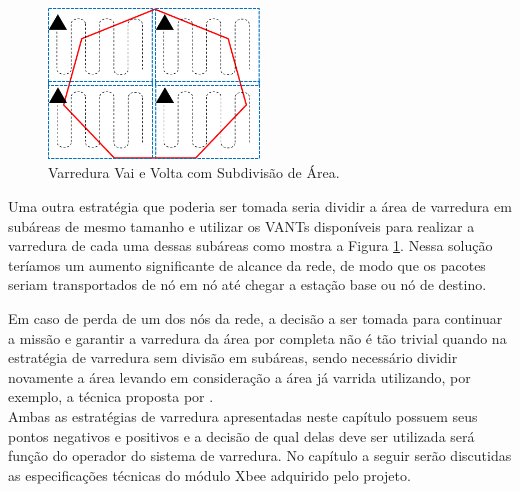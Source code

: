 \begin{figure} 
\center
\includegraphics[width=0.5\textwidth]{comsubdivisao.png}
\caption{Varredura Vai e Volta com Subdivisão de Área.} 
\label{fig:comsubdivisao}
\end{figure}

Uma outra estratégia que poderia ser tomada seria dividir a área de varredura em subáreas de mesmo tamanho e utilizar os VANTs disponíveis para realizar a varredura de cada uma dessas subáreas como mostra a Figura \ref{fig:comsubdivisao}. Nessa solução teríamos um aumento significante de alcance da rede, de modo que os pacotes seriam transportados de nó em nó até chegar a estação base ou nó de destino.

Em caso de perda de um dos nós da rede, a decisão a ser tomada para continuar a missão e garantir a varredura da área por completa não é tão trivial quando na estratégia de varredura sem divisão em subáreas, sendo necessário dividir novamente a área levando em consideração a área já varrida utilizando, por exemplo, a técnica proposta por \cite{marro2013path}.\\

Ambas as estratégias de varredura apresentadas neste capítulo possuem seus pontos negativos e positivos e a decisão de qual delas deve ser utilizada será função do operador do sistema de varredura. No capítulo a seguir serão discutidas as especificações técnicas do módulo Xbee adquirido pelo projeto.





